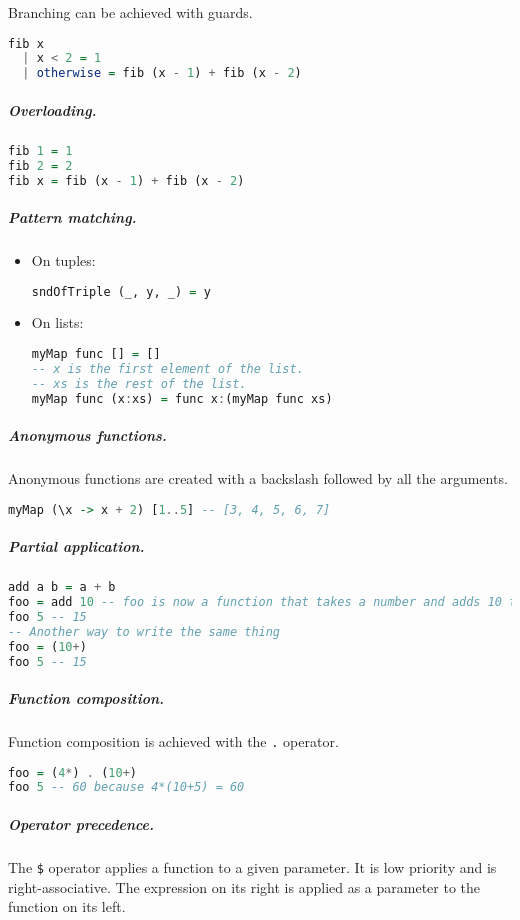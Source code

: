 Branching can be achieved with guards.
\begin{lstlisting}[language=haskell, style=snippet]
fib x
  | x < 2 = 1
  | otherwise = fib (x - 1) + fib (x - 2)
\end{lstlisting}

\subparagraph{Overloading.}
\begin{lstlisting}[language=haskell, style=snippet]
fib 1 = 1
fib 2 = 2
fib x = fib (x - 1) + fib (x - 2)
\end{lstlisting}

\subparagraph{Pattern matching.}
\begin{itemize}
\item On tuples:
\begin{lstlisting}[language=haskell, style=snippet]
sndOfTriple (_, y, _) = y
\end{lstlisting}
\item On lists:
\begin{lstlisting}[language=haskell, style=snippet]
myMap func [] = []
-- x is the first element of the list. 
-- xs is the rest of the list. 
myMap func (x:xs) = func x:(myMap func xs)
\end{lstlisting}
\end{itemize}

\subparagraph{Anonymous functions.} Anonymous functions are created with a backslash followed by all the arguments.
\begin{lstlisting}[language=haskell, style=snippet]
myMap (\x -> x + 2) [1..5] -- [3, 4, 5, 6, 7]
\end{lstlisting}

\subparagraph{Partial application.}
\begin{lstlisting}[language=haskell, style=snippet]
add a b = a + b
foo = add 10 -- foo is now a function that takes a number and adds 10 to it
foo 5 -- 15
-- Another way to write the same thing
foo = (10+)
foo 5 -- 15
\end{lstlisting}

\subparagraph{Function composition.} Function composition is achieved with the \texttt{.} operator.
\begin{lstlisting}[language=haskell, style=snippet]
foo = (4*) . (10+)
foo 5 -- 60 because 4*(10+5) = 60
\end{lstlisting}

\subparagraph{Operator precedence.} The \texttt{\$} operator applies a function to a given parameter. It is low priority and is right-associative. The expression on its right is applied as a parameter to the function on its left.


